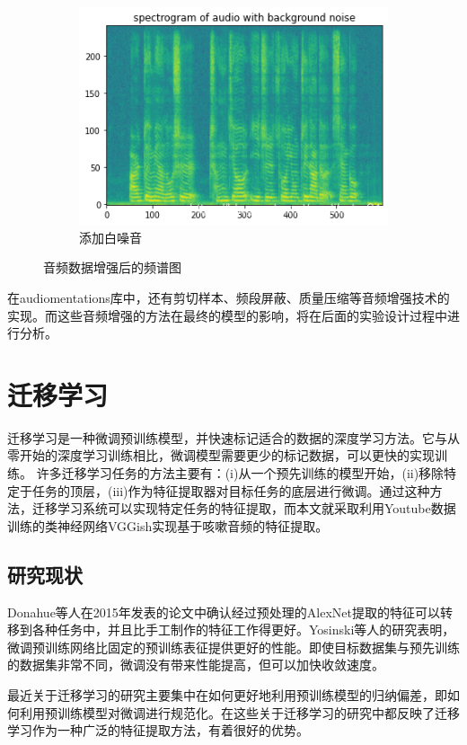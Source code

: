 \begin{figure}[h]
\begin{subfigure}{0.3\textwidth}
        \includegraphics[width=\linewidth]{figures/oabn.png}
        \caption{添加白噪音}
        \label{fig:oabn}
      \end{subfigure}
      \caption{音频数据增强后的频谱图}
      \label{fig:multi-image}
    \end{figure}
    
在audiomentations库中，还有剪切样本、频段屏蔽、质量压缩等音频增强技术的实现。而这些音频增强的方法在最终的模型的影响，将在后面的实验设计过程中进行分析。
\section{迁移学习}
迁移学习是一种微调预训练模型，并快速标记适合的数据的深度学习方法。它与从零开始的深度学习训练相比，微调模型需要更少的标记数据，可以更快的实现训练。
许多迁移学习任务的方法主要有：(i)从一个预先训练的模型开始，(ii)移除特定于任务的顶层，(iii)作为特征提取器对目标任务的底层进行微调。通过这种方法，迁移学习系统可以实现特定任务的特征提取，而本文就采取利用Youtube数据训练的类神经网络VGGish实现基于咳嗽音频的特征提取。
\subsection{研究现状}
Donahue等人在2015年发表的论文\cite{2015The}中确认经过预处理的AlexNet提取的特征可以转移到各种任务中，并且比手工制作的特征工作得更好。Yosinski等人的研究\cite{2014How}表明，微调预训练网络比固定的预训练表征提供更好的性能。即使目标数据集与预先训练的数据集非常不同，微调没有带来性能提高，但可以加快收敛速度。

最近关于迁移学习的研究主要集中在如何更好地利用预训练模型的归纳偏差，即如何利用预训练模型对微调进行规范化。在这些关于迁移学习的研究中都反映了迁移学习作为一种广泛的特征提取方法，有着很好的优势。

